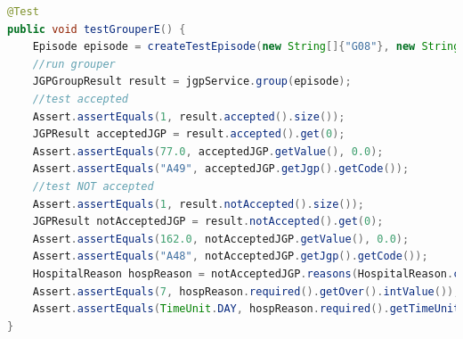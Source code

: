 \begin{lstlisting}[language=Java]
@Test
public void testGrouperE() {
    Episode episode = createTestEpisode(new String[]{"G08"}, new String[]{"88.714"}, 7, 75);
    //run grouper
    JGPGroupResult result = jgpService.group(episode);
    //test accepted
    Assert.assertEquals(1, result.accepted().size());
    JGPResult acceptedJGP = result.accepted().get(0);
    Assert.assertEquals(77.0, acceptedJGP.getValue(), 0.0);
    Assert.assertEquals("A49", acceptedJGP.getJgp().getCode());
    //test NOT accepted
    Assert.assertEquals(1, result.notAccepted().size());
    JGPResult notAcceptedJGP = result.notAccepted().get(0);
    Assert.assertEquals(162.0, notAcceptedJGP.getValue(), 0.0);
    Assert.assertEquals("A48", notAcceptedJGP.getJgp().getCode());
    HospitalReason hospReason = notAcceptedJGP.reasons(HospitalReason.class).get(0);
    Assert.assertEquals(7, hospReason.required().getOver().intValue());
    Assert.assertEquals(TimeUnit.DAY, hospReason.required().getTimeUnit());
}
\end{lstlisting}

